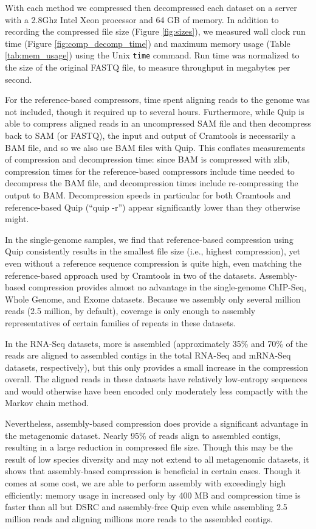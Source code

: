 \documentclass[a4,center,fleqn]{NAR}
\begin{document}
With each method we compressed then decompressed each dataset on a server with
a 2.8Ghz Intel Xeon processor and 64 GB of memory. In addition to recording
the compressed file size (Figure \ref{fig:sizes}), we measured wall clock run
time (Figure \ref{fig:comp_decomp_time}) and maximum memory usage (Table
\ref{tab:mem_usage}) using the Unix \texttt{time} command. Run time was 
normalized to the size of the original FASTQ file, to measure throughput in
megabytes per second.

For the reference-based compressors, time spent aligning reads to the genome
was not included, though it required up to several hours. Furthermore, while
Quip is able to compress aligned reads in an uncompressed SAM file and then
decompress back to SAM (or FASTQ), the input and output of Cramtools is
necessarily a BAM file, and so we also use BAM files with Quip. This conflates
measurements of compression and decompression time: since BAM is compressed
with zlib, compression times for the reference-based compressors include time
needed to decompress the BAM file, and decompression times include
re-compressing the output to BAM. Decompression speeds in particular for both
Cramtools and reference-based Quip (``quip -r'') appear significantly lower
than they otherwise might.

In the single-genome samples, we find that reference-based compression using
Quip consistently results in the smallest file size (i.e., highest
compression), yet even without a reference sequence compression is quite high,
even matching the reference-based approach used by Cramtools in two of the
datasets. Assembly-based compression provides almost no advantage in the
single-genome ChIP-Seq, Whole Genome, and Exome datasets. Because we assembly
only several million reads (2.5 million, by default), coverage is only enough
to assembly representatives of certain families of repeats in these datasets.

In the RNA-Seq datasets, more is assembled (approximately 35\% and 70\% of the
reads are aligned to assembled contigs in the total RNA-Seq and mRNA-Seq
datasets, respectively), but this only provides a small increase in the
compression overall. The aligned reads in these datasets have relatively
low-entropy sequences and would otherwise have been encoded only moderately less
compactly with the Markov chain method.

Nevertheless, assembly-based compression does provide a significant advantage
in the metagenomic dataset. Nearly 95\% of reads align to assembled contigs,
resulting in a large reduction in compressed file size. Though this may be the
result of low species diversity and may not extend to all metagenomic
datasets, it shows that assembly-based compression is beneficial in certain
cases. Though it comes at some cost, we are able to perform assembly with
exceedingly  high efficiently: memory usage in increased only by 400 MB and
compression time is faster than all but DSRC and assembly-free Quip even while
assembling 2.5 million reads and aligning millions more reads to the assembled
contigs.
\end{document}
